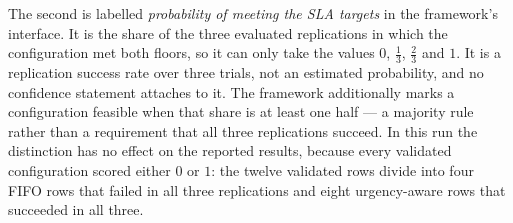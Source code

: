 The second is labelled \emph{probability of meeting the SLA targets} in the framework's
interface. It is the share of the three evaluated replications in which the configuration met
both floors, so it can only take the values \(0\), \(\tfrac{1}{3}\), \(\tfrac{2}{3}\) and
\(1\). It is a replication success rate over three trials, not an estimated probability, and no
confidence statement attaches to it. The framework additionally marks a configuration feasible
when that share is at least one half --- a majority rule rather than a requirement that all
three replications succeed. In this run the distinction has no effect on the reported results,
because every validated configuration scored either \(0\) or \(1\): the twelve validated rows
divide into four FIFO rows that failed in all three replications and eight urgency-aware rows
that succeeded in all three.

